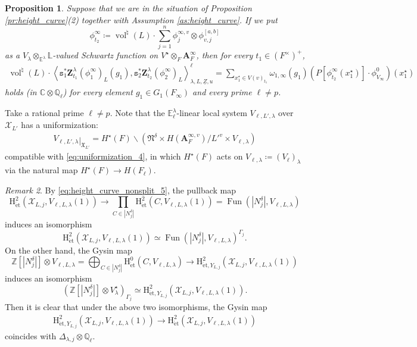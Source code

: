 \documentclass[12pt]{amsart}
\numberwithin{equation}{section}
\theoremstyle{plain}
\newtheorem{proposition}{Proposition}[section]
\theoremstyle{definition}
\theoremstyle{remark}
\newtheorem{remark}[proposition]{Remark}
\renewcommand{\b}[1]{\mathbf{#1}}
\renewcommand{\c}[1]{\mathcal{#1}}
\renewcommand{\d}[1]{\mathbb{#1}}
\newcommand{\f}[1]{\mathfrak{#1}}
\renewcommand{\r}[1]{\mathrm{#1}}
\renewcommand{\(}{\left(}
\renewcommand{\)}{\right)}
\newcommand{\res}{\mathbin{|}}
\newcommand{\ul}{\underline}
\newcommand{\bA}{\b A}
\newcommand{\cX}{\c X}
\newcommand{\dC}{\d C}
\newcommand{\dE}{\d E}
\newcommand{\dL}{\d L}
\newcommand{\dQ}{\d Q}
\newcommand{\dZ}{\d Z}
\newcommand{\fN}{\f N}
\newcommand{\fX}{\f X}
\newcommand{\rH}{\r H}
\newcommand{\ts}{\mathtt{s}}
\newcommand{\bbZ}{\boldsymbol{Z}}
\newcommand{\llangle}{\left\langle}
\newcommand{\rrangle}{\right\rangle}
\newcommand{\et}{{\acute{\r{e}}\r{t}}}
\DeclareMathOperator{\Fun}{Fun}
\DeclareMathOperator{\vol}{vol}
\begin{document}
\begin{proposition}\label{pr:height_curve_nonsplit}
Suppose that we are in the situation of Proposition \ref{pr:height_curve}(2) together with Assumption \ref{as:height_curve}. If we put
\[
\phi^\infty_{t_2}\coloneqq\vol^\natural(L)\cdot\sum_{j=1}^n\phi^{\infty,v}_j\otimes\phi^{[a,b]}_{v,j}
\]
as a $V_\lambda\otimes_{\dE^\lambda}\dL$-valued Schwartz function on $V^\star\otimes_F\bA_F^\infty$, then for every $t_1\in(F^\times)^+$,
\begin{align*}
\vol^\natural(L)\cdot
\llangle\ts_1^*\bbZ^\lambda_{t_1}(\phi^\infty_1)_L(g_1),
\ts_2^*\bbZ^\lambda_{t_2}(\phi^\infty_2)_L\rrangle_{\lambda,L,\ul{Z},u}^\ell
=\sum_{x^\star_1\in V(v)_{t_1}}\omega_{1,\infty}(g_1)\(P[\phi^\infty_{t_2}(x^\star_1)]\cdot\phi^0_{V_\infty}\)(x^\star_1)
\end{align*}
holds (in $\dC\otimes\dQ_\ell$) for every element $g_1\in G_1(F_\infty)$ and every prime $\ell\neq p$.
\end{proposition}







Take a rational prime $\ell\neq p$. Note that the $\dE^\lambda_\ell$-linear local system $V_{\ell,L',\lambda}$ over $\cX_{L'}$ has a uniformization:
\begin{align}\label{eq:height_curve_nonsplit_5}
V_{\ell,L',\lambda}\res_{\fX_{L'}}=H^\star(F)\backslash\(\fN^\delta\times H(\bA_F^{\infty,v})/{L'}^v\times V_{\ell,\lambda}\)
\end{align}
compatible with \eqref{eq:uniformization_4}, in which $H^\star(F)$ acts on $V_{\ell,\lambda}\coloneqq(V_\ell)_\lambda$ via the natural map $H^\star(F)\to H(F_\ell)$.

\begin{remark}\label{re:height_curve_nonsplit}
By \eqref{eq:height_curve_nonsplit_5}, the pullback map
\[
\rH^2_{\et}(\cX_{L,j},V_{\ell,L,\lambda}(1))\to\prod_{C\in|N^\delta_j|}\rH^2_{\et}(C,V_{\ell,L,\lambda}(1))=
\Fun(|N^\delta_j|,V_{\ell,L,\lambda})
\]
induces an isomorphism
\[
\rH^2_{\et}(\cX_{L,j},V_{\ell,L,\lambda}(1))\simeq\Fun(|N^\delta_j|,V_{\ell,L,\lambda})^{\Gamma_j}.
\]
On the other hand, the Gysin map
\[
\dZ[|N^\delta_j|]\otimes V_{\ell,L,\lambda}=
\bigoplus_{C\in|N^\delta_j|}\rH^0_{\et}(C,V_{\ell,L,\lambda})\to\rH^2_{\et,Y_{L,j}}(\cX_{L,j},V_{\ell,L,\lambda}(1))
\]
induces an isomorphism
\[
\(\dZ[|N^\delta_j|]\otimes V^\star_\lambda\)_{\Gamma_j}\simeq\rH^2_{\et,Y_{L,j}}(\cX_{L,j},V_{\ell,L,\lambda}(1)).
\]
Then it is clear that under the above two isomorphisms, the Gysin map
\begin{align}\label{eq:height_curve_nonsplit_1}
\rH^2_{\et,Y_{L,j}}(\cX_{L,j},V_{\ell,L,\lambda}(1))\to\rH^2_{\et}(\cX_{L,j},V_{\ell,L,\lambda}(1))
\end{align}
coincides with $\Delta_{\lambda,j}\otimes\dQ_\ell$.
\end{remark}
\end{document}
